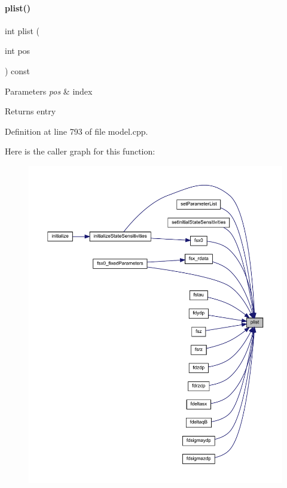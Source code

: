 \paragraph{\texorpdfstring{plist()}{plist()}}
{\footnotesize\ttfamily int plist (\begin{DoxyParamCaption}\item[{int}]{pos }\end{DoxyParamCaption}) const}


\begin{DoxyParams}{Parameters}
{\em pos} & index \\
\hline
\end{DoxyParams}
\begin{DoxyReturn}{Returns}
entry 
\end{DoxyReturn}


Definition at line 793 of file model.\+cpp.

Here is the caller graph for this function\+:
\nopagebreak
\begin{figure}[H]
\begin{center}
\leavevmode
\includegraphics[width=350pt]{classamici_1_1_model_a6ac0de1b7dfddbb4a480657f62573563_icgraph}
\end{center}
\end{figure}
\mbox{\label{classamici_1_1_model_a7e63009c65fc1361cc5a6e1fc3d5ff1a}} 
